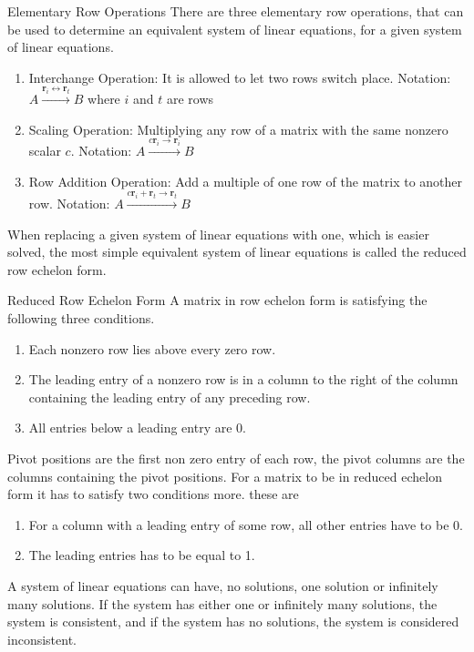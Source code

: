 \begin{definition}{Elementary Row Operations}
There are three elementary row operations, that can be used to determine an equivalent system of linear equations, for a given system of linear equations.
\begin{enumerate}
    \item Interchange Operation:
    It is allowed to let two rows switch place.
    Notation: $A\xrightarrow{\textbf{r}_i\leftrightarrow \textbf{r}_t} B$ where $i$ and $t$ are rows
    \item Scaling Operation:
    Multiplying any row of a matrix with the same nonzero scalar $c$.
    Notation: $A\xrightarrow{c\textbf{r}_i\rightarrow \textbf{r}_i} B$
    \item Row Addition Operation:
    Add a multiple of one row of the matrix to another row.
    Notation: $A\xrightarrow{c\textbf{r}_i+\textbf{r}_t\rightarrow \textbf{r}_t} B$
\end{enumerate}
\cite[32]{LiAl}
\end{definition}

When replacing a given system of linear equations with one, which is easier solved, the most simple equivalent system of linear equations is called the reduced row echelon form. 
\begin{definition}{Reduced Row Echelon Form}
A matrix in row echelon form is satisfying the following three conditions.
\begin{enumerate}
    \item Each nonzero row lies above every zero row.
    \item The leading entry of a nonzero row is in a column to the right of the column containing the leading entry of any preceding row.
    \item All entries below a leading entry are $0$.
\end{enumerate}
Pivot positions are the first non zero entry of each row, the pivot columns are the columns containing the pivot positions. 
For a matrix to be in reduced echelon form it has to satisfy two conditions more. these are
\begin{enumerate}
    \item For a column with a leading entry of some row, all other entries have to be 0.
    \item The leading entries has to be equal to 1.
\end{enumerate}
\cite[33]{LiAl}
\end{definition}
A system of linear equations can have, no solutions, one solution or infinitely many solutions. If the system has either one or infinitely many solutions, the system is consistent, and if the system has no solutions, the system is considered inconsistent.

